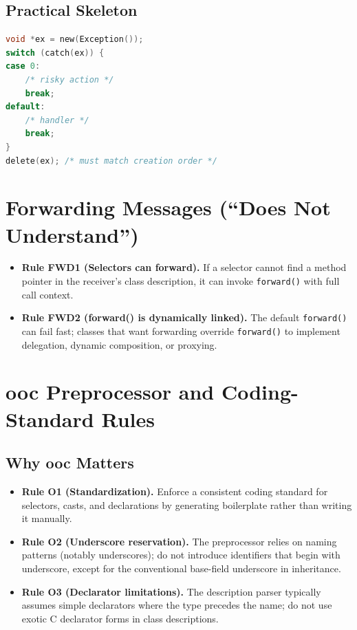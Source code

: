 \documentclass[11pt]{article}
\begin{document}
\subsection{Practical Skeleton}

\begin{lstlisting}[language=C]
void *ex = new(Exception());
switch (catch(ex)) {
case 0:
    /* risky action */
    break;
default:
    /* handler */
    break;
}
delete(ex); /* must match creation order */
\end{lstlisting}

\section{Forwarding Messages (``Does Not Understand'')}

\begin{itemize}
  \item \textbf{Rule FWD1 (Selectors can forward).} If a selector cannot find a method pointer in the receiver's class description, it can invoke \texttt{forward()} with full call context.
  \item \textbf{Rule FWD2 (forward() is dynamically linked).} The default \texttt{forward()} can fail fast; classes that want forwarding override \texttt{forward()} to implement delegation, dynamic composition, or proxying.
\end{itemize}

\section{ooc Preprocessor and Coding-Standard Rules}

\subsection{Why ooc Matters}

\begin{itemize}
  \item \textbf{Rule O1 (Standardization).} Enforce a consistent coding standard for selectors, casts, and declarations by generating boilerplate rather than writing it manually.
  \item \textbf{Rule O2 (Underscore reservation).} The preprocessor relies on naming patterns (notably underscores); do not introduce identifiers that begin with underscore, except for the conventional base-field underscore in inheritance.
  \item \textbf{Rule O3 (Declarator limitations).} The description parser typically assumes simple declarators where the type precedes the name; do not use exotic C declarator forms in class descriptions.
\end{itemize}
\end{document}
